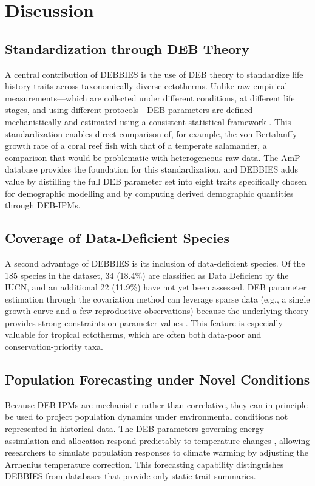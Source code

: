 \documentclass[11pt]{article}
\begin{document}
\section{Discussion}

\subsection{Standardization through DEB Theory}

A central contribution of DEBBIES is the use of DEB theory to standardize life history traits across taxonomically diverse ectotherms. Unlike raw empirical measurements---which are collected under different conditions, at different life stages, and using different protocols---DEB parameters are defined mechanistically and estimated using a consistent statistical framework \citep{lika2011}. This standardization enables direct comparison of, for example, the von Bertalanffy growth rate of a coral reef fish with that of a temperate salamander, a comparison that would be problematic with heterogeneous raw data. The AmP database \citep{marques2018} provides the foundation for this standardization, and DEBBIES adds value by distilling the full DEB parameter set into eight traits specifically chosen for demographic modelling and by computing derived demographic quantities through DEB-IPMs.

\subsection{Coverage of Data-Deficient Species}

A second advantage of DEBBIES is its inclusion of data-deficient species. Of the 185 species in the dataset, 34 (18.4\%) are classified as Data Deficient by the IUCN, and an additional 22 (11.9\%) have not yet been assessed. DEB parameter estimation through the covariation method can leverage sparse data (e.g., a single growth curve and a few reproductive observations) because the underlying theory provides strong constraints on parameter values \citep{kooijman2010}. This feature is especially valuable for tropical ectotherms, which are often both data-poor and conservation-priority taxa.

\subsection{Population Forecasting under Novel Conditions}

Because DEB-IPMs are mechanistic rather than correlative, they can in principle be used to project population dynamics under environmental conditions not represented in historical data. The DEB parameters governing energy assimilation and allocation respond predictably to temperature changes \citep{kooijman2010, nisbet2000}, allowing researchers to simulate population responses to climate warming by adjusting the Arrhenius temperature correction. This forecasting capability distinguishes DEBBIES from databases that provide only static trait summaries.
\end{document}
